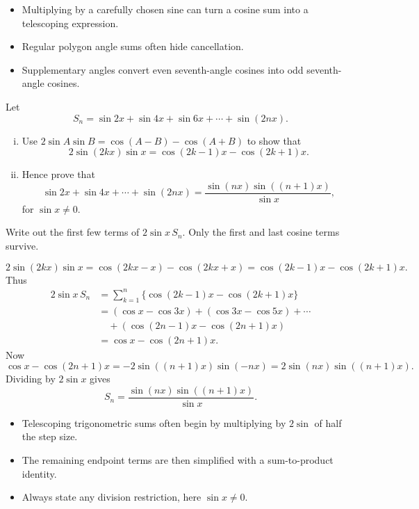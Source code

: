 \begin{takeaways}
\begin{itemize}[leftmargin=*]
  \item Multiplying by a carefully chosen sine can turn a cosine sum into a
        telescoping expression.
  \item Regular polygon angle sums often hide cancellation.
  \item Supplementary angles convert even seventh-angle cosines into odd
        seventh-angle cosines.
\end{itemize}
\end{takeaways}

\begin{problem}
Let
\[
S_n=\sin2x+\sin4x+\sin6x+\cdots+\sin(2nx).
\]
\begin{enumerate}[(i)]
  \item Use $2\sin A\sin B=\cos(A-B)-\cos(A+B)$ to show that
  \[
  2\sin(2kx)\sin x=\cos(2k-1)x-\cos(2k+1)x.
  \]
  \item Hence prove that
  \[
  \sin2x+\sin4x+\cdots+\sin(2nx)
  =
  \frac{\sin(nx)\sin((n+1)x)}{\sin x},
  \]
  for $\sin x\ne0$.
\end{enumerate}
\end{problem}

\begin{hintbox}
Write out the first few terms of $2\sin x\,S_n$. Only the first and last cosine
terms survive.
\end{hintbox}

\begin{solution}
\[
2\sin(2kx)\sin x
=\cos(2kx-x)-\cos(2kx+x)
=\cos(2k-1)x-\cos(2k+1)x.
\]
Thus
\[
\begin{aligned}
2\sin x\,S_n
&=\sum_{k=1}^{n}\{\cos(2k-1)x-\cos(2k+1)x\}\\
&=(\cos x-\cos3x)+(\cos3x-\cos5x)+\cdots\\
&\quad+(\cos(2n-1)x-\cos(2n+1)x)\\
&=\cos x-\cos(2n+1)x.
\end{aligned}
\]
Now
\[
\cos x-\cos(2n+1)x
=
-2\sin((n+1)x)\sin(-nx)
=2\sin(nx)\sin((n+1)x).
\]
Dividing by $2\sin x$ gives
\[
S_n=\frac{\sin(nx)\sin((n+1)x)}{\sin x}.
\]
\end{solution}

\begin{takeaways}
\begin{itemize}[leftmargin=*]
  \item Telescoping trigonometric sums often begin by multiplying by
        $2\sin$ of half the step size.
  \item The remaining endpoint terms are then simplified with a sum-to-product
        identity.
  \item Always state any division restriction, here $\sin x\ne0$.
\end{itemize}
\end{takeaways}

